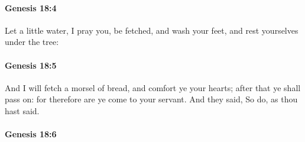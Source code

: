 
		\paragraph{Genesis 18:4} %
			\label{GENESIS-18-4}

			Let a little water, I pray you, be fetched, and wash your feet, and rest yourselves under the tree:


		\paragraph{Genesis 18:5} %
			\label{GENESIS-18-5}

			And I will fetch a morsel of bread, and comfort ye your hearts; after that ye shall pass on: for therefore are ye come to your servant.  And they said, So do, as thou hast said.


		\paragraph{Genesis 18:6} %
			\label{GENESIS-18-6}

